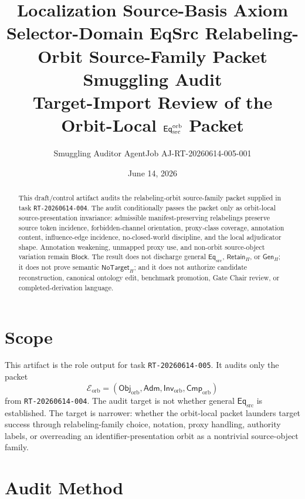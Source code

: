 \documentclass[11pt]{article}
\title{\textbf{Localization Source-Basis Axiom Selector-Domain EqSrc Relabeling-Orbit Source-Family Packet Smuggling Audit}\\[0.35em]
\large Target-Import Review of the Orbit-Local \(\mathsf{Eq}_{\mathrm{src}}^{\mathrm{orb}}\) Packet}
\author{Smuggling Auditor AgentJob AJ-RT-20260614-005-001}
\date{June 14, 2026}
\newcommand{\ObjOrb}{\mathsf{Obj}_{\mathrm{orb}}}
\newcommand{\Adm}{\mathsf{Adm}}
\newcommand{\InvOrb}{\mathsf{Inv}_{\mathrm{orb}}}
\newcommand{\CmpOrb}{\mathsf{Cmp}_{\mathrm{orb}}}
\newcommand{\EqSrc}{\mathsf{Eq}_{\mathrm{src}}}
\newcommand{\GenH}{\mathsf{Gen}_{H}}
\newcommand{\RetainH}{\mathsf{Retain}_{H}}
\newcommand{\NoTargetH}{\mathsf{NoTarget}_{H}}
\newcommand{\Block}{\mathsf{Block}}
\begin{document}
\maketitle

\begin{abstract}
This draft/control artifact audits the relabeling-orbit source-family
packet supplied in task \texttt{RT-20260614-004}. The audit conditionally
passes the packet only as orbit-local source-presentation invariance:
admissible manifest-preserving relabelings preserve source token
incidence, forbidden-channel orientation, proxy-class coverage,
annotation content, influence-edge incidence, no-closed-world discipline,
and the local adjudicator shape. Annotation weakening, unmapped proxy use,
and non-orbit source-object variation remain \(\Block\). The result does
not discharge general \(\EqSrc\), \(\RetainH\), or \(\GenH\); it does not
prove semantic \(\NoTargetH\); and it does not authorize candidate
reconstruction, canonical ontology edit, benchmark promotion, Gate Chair
review, or completed-derivation language.
\end{abstract}

\section{Scope}

This artifact is the role output for task \texttt{RT-20260614-005}. It
audits only the packet
\[
    \mathcal{E}_{\mathrm{orb}}=(\ObjOrb,\Adm,\InvOrb,\CmpOrb)
\]
from \texttt{RT-20260614-004}. The audit target is not whether general
\(\EqSrc\) is established. The target is narrower: whether the
orbit-local packet launders target success through relabeling-family
choice, notation, proxy handling, authority labels, or overreading an
identifier-presentation orbit as a nontrivial source-object family.

\section{Audit Method}
\end{document}

